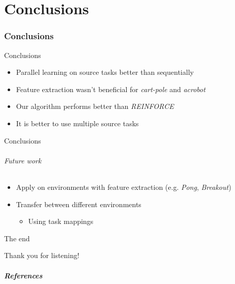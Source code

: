 \part{Conclusions}
\section{Conclusions}
\begin{frame}[fragile]{Conclusions}
\begin{itemize}
    \item Parallel learning on source tasks better than sequentially
    \item Feature extraction wasn't beneficial for \textit{cart-pole} and \textit{acrobot}
    \item Our algorithm performs better than \textit{REINFORCE}
    \item It is better to use multiple source tasks
\end{itemize}
\end{frame}


\begin{frame}[fragile]{Conclusions}
\framesubtitle{Future work}
\begin{itemize}
    \item Apply on environments with feature extraction (e.g. \textit{Pong}, \textit{Breakout})
    \item Transfer between different environments
    \begin{itemize}
        \item Using task mappings
    \end{itemize}
\end{itemize}
\end{frame}

\begin{frame}[c]{The end}
\begin{center}
    \color{vubbleu} \LARGE\vubfont Thank you for listening!
\end{center}
\end{frame}

\begin{frame}[allowframebreaks]
\frametitle{References}
\footnotesize{


}
\end{frame}


